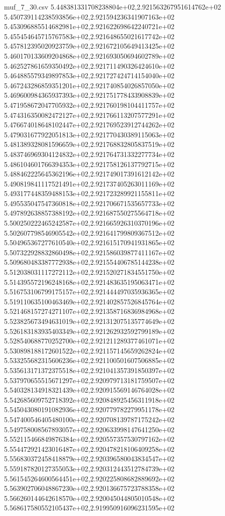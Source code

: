 \begin{filecontents*}{muf_7_30.csv}
5.448381331708238804e+02,2.921563267951614762e+02
5.450739114238593856e+02,2.921594236341907163e+02
5.453096885514682981e+02,2.921622698642240721e+02
5.455454645715767583e+02,2.921648655021617742e+02
5.457812395020923759e+02,2.921672105649413425e+02
5.460170133609204868e+02,2.921693050694602789e+02
5.462527861659350492e+02,2.921711490326424610e+02
5.464885579349897853e+02,2.921727424714154040e+02
5.467243286859351201e+02,2.921740854026857050e+02
5.469600984365937393e+02,2.921751778433908839e+02
5.471958672047705932e+02,2.921760198104411757e+02
5.474316350082472127e+02,2.921766113207577291e+02
5.476674018648102447e+02,2.921769523912744262e+02
5.479031677922051813e+02,2.921770430389115063e+02
5.481389328081596659e+02,2.921768832805837519e+02
5.483746969304124832e+02,2.921764731332277734e+02
5.486104601766394353e+02,2.921758126137792715e+02
5.488462225645362196e+02,2.921749017391612142e+02
5.490819841117521491e+02,2.921737405263011169e+02
5.493177448359488153e+02,2.921723289921155811e+02
5.495535047547360818e+02,2.921706671535657733e+02
5.497892638857388192e+02,2.921687550275564718e+02
5.500250222465242587e+02,2.921665926310370196e+02
5.502607798546905542e+02,2.921641799809367512e+02
5.504965367277610540e+02,2.921615170941931865e+02
5.507322928832860498e+02,2.921586039877411167e+02
5.509680483387772938e+02,2.921554406785144238e+02
5.512038031117272112e+02,2.921520271834551750e+02
5.514395572196248168e+02,2.921483635195063471e+02
5.516753106799175157e+02,2.921444497035936365e+02
5.519110635100463469e+02,2.921402857526845764e+02
5.521468157274271107e+02,2.921358716836984968e+02
5.523825673494631019e+02,2.921312075135774649e+02
5.526183183935403349e+02,2.921262932592799189e+02
5.528540688770252700e+02,2.921211289377461071e+02
5.530898188172601522e+02,2.921157145659262824e+02
5.533255682315606236e+02,2.921100501607506885e+02
5.535613171372375518e+02,2.921041357391850397e+02
5.537970655515671297e+02,2.920979713181759507e+02
5.540328134918321439e+02,2.920915569146764028e+02
5.542685609752718392e+02,2.920848925456311918e+02
5.545043080191082936e+02,2.920779782279951178e+02
5.547400546405480100e+02,2.920708139787175242e+02
5.549758008567893057e+02,2.920633998147641250e+02
5.552115466849876384e+02,2.920557357530797162e+02
5.554472921423016487e+02,2.920478218106409258e+02
5.556830372458418879e+02,2.920396580043834547e+02
5.559187820127355053e+02,2.920312443512784739e+02
5.561545264600564451e+02,2.920225808682889692e+02
5.563902706048867230e+02,2.920136675723788358e+02
5.566260144642618570e+02,2.920045044805010548e+02
5.568617580552105437e+02,2.919950916096231595e+02

\end{filecontents*}

